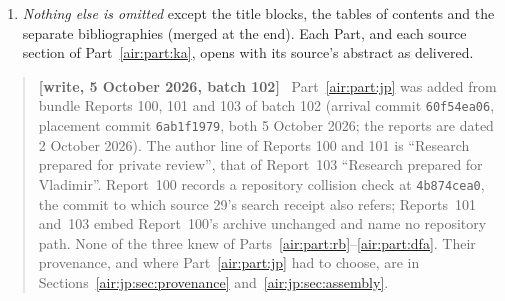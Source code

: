 \documentclass[11pt,letterpaper]{article}
\numberwithin{equation}{section}
\theoremstyle{remark}
\newenvironment{writenotejp}{\par\smallskip\begin{quote}\small\textbf{[write, 5 October 2026, batch 102]}\ }{\end{quote}\smallskip}
\begin{document}
\begin{enumerate}
\item \emph{Nothing else is omitted} except the title blocks, the tables of contents and the separate bibliographies (merged at the end). Each Part, and each source section of Part~\ref{air:part:ka}, opens with its source's abstract as delivered.
\end{enumerate}
\begin{writenotejp}
Part~\ref{air:part:jp} was added from bundle Reports 100, 101 and 103 of batch 102 (arrival commit \texttt{60f54ea06}, placement commit \texttt{6ab1f1979}, both 5 October 2026; the reports are dated 2 October 2026). The author line of Reports 100 and 101 is ``Research prepared for private review'', that of Report~103 ``Research prepared for Vladimir''. Report~100 records a repository collision check at \texttt{4b874cea0}, the commit to which source 29's search receipt also refers; Reports~101 and~103 embed Report~100's archive unchanged and name no repository path. None of the three knew of Parts~\ref{air:part:rb}--\ref{air:part:dfa}. Their provenance, and where Part~\ref{air:part:jp} had to choose, are in Sections~\ref{air:jp:sec:provenance} and~\ref{air:jp:sec:assembly}.
\end{writenotejp}
\end{document}
